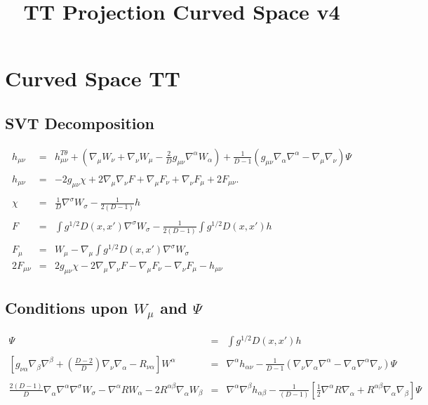 \documentclass[10pt,letterpaper]{article}
\title{TT Projection Curved Space v4}
\date{}
\numberwithin{equation}{section}
\begin{document}
 
\maketitle
\noindent 

\section{Curved Space TT}
%
%
\subsection{SVT Decomposition}
%
%
\begin{eqnarray}
h_{\mu\nu} &=& h_{\mu\nu}^{T\theta} + \left(\nabla_\mu W_\nu + \nabla_\nu W_\mu - \frac{2}{D}g_{\mu\nu}\nabla^\alpha W_\alpha\right) +\frac{1}{D-1}\left( g_{\mu\nu}\nabla_\alpha \nabla^\alpha - \nabla_\mu\nabla_\nu\right)\Psi
\\  \nonumber\\
h_{\mu\nu} &=& -2g_{\mu\nu}\chi + 2\nabla_\mu\nabla_\nu F + \nabla_\mu F_\nu + \nabla_\nu F_\mu + 2F_{\mu\nu}.
\\ \nonumber\\
\chi &=& \frac{1}{D}\nabla^\sigma W_{\sigma}  - \frac{1}{2(D-1)}h
\label{chi}\\ \nonumber\\
F &=& \int g^{1/2} D(x,x') \nabla^\sigma W_{\sigma}  - \frac{1}{2(D-1)}\int g^{1/2} D(x,x') h
\\ \nonumber\\
F_{\mu} &=& W_{\mu} -\nabla_\mu \int g^{1/2} D(x,x')\nabla^{\sigma}W_\sigma
\nonumber\\
2F_{\mu\nu} &=& 2g_{\mu\nu}\chi - 2\nabla_\mu\nabla_\nu F - \nabla_\mu F_\nu - \nabla_\nu F_{\mu} - h_{\mu\nu} 
\end{eqnarray}
%
\subsection{Conditions upon $W_\mu$ and $\Psi$}
%
\begin{eqnarray}
\Psi &=& \int g^{1/2} D(x,x') h
\\ \nonumber\\
\left[g_{\nu\alpha}\nabla_\beta\nabla^\beta + \left(\frac{D-2}{D}\right)\nabla_\nu \nabla_\alpha - R_{\nu\alpha}\right]W^\alpha &=&
\nabla^\alpha h_{\alpha\nu} - \frac{1}{D-1}\left(\nabla_\nu \nabla_\alpha\nabla^\alpha - \nabla_\alpha\nabla^\alpha \nabla_\nu\right)
\Psi
\\ \nonumber\\
\frac{2(D-1)}{D}\nabla_\alpha\nabla^\alpha \nabla^\sigma W_\sigma - \nabla^\alpha R W_\alpha - 2R^{\alpha\beta} \nabla_\alpha W_{\beta} &=& 
\nabla^\alpha\nabla^\beta h_{\alpha\beta} - \frac{1}{(D-1)}\left[ \tfrac12 \nabla^\alpha R \nabla_\alpha + R^{\alpha\beta}\nabla_\alpha\nabla_\beta\right]\Psi
\label{con2}
\end{eqnarray}
%
%
\end{document}
